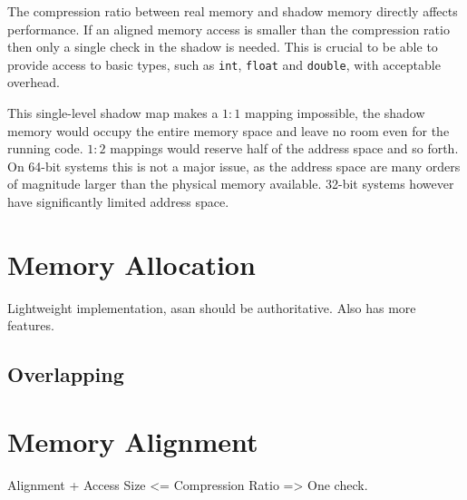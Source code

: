The compression ratio between real memory and shadow memory directly affects
performance. If an aligned memory access is smaller than the compression ratio
then only a single check in the shadow is needed. This is crucial to be able to
provide access to basic types, such as \texttt{int}, \texttt{float} and
\texttt{double}, with acceptable overhead.

This single-level shadow map makes a $1:1$ mapping impossible, the shadow memory
would occupy the entire memory space and leave no room even for the running
code. $1:2$ mappings would reserve half of the address space and so forth. On
64-bit systems this is not a major issue, as the address space are many orders
of magnitude larger than the physical memory available. 32-bit systems however
have significantly limited address space.


\section {Memory Allocation}
Lightweight implementation, asan should be authoritative. Also has more
features.

\subsection {Overlapping}


\section {Memory Alignment}

Alignment + Access Size <= Compression Ratio => One check.

